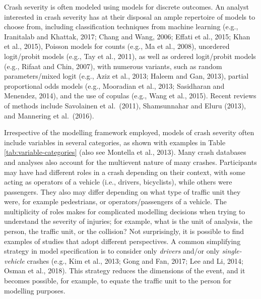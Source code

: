 \documentclass[]{elsarticle} %
\begin{document}
Crash severity is often modeled using models for discrete outcomes. An
analyst interested in crash severity has at their disposal an ample
repertoire of models to choose from, including classification techniques
from machine learning (e.g., Iranitalab and Khattak, 2017; Chang and
Wang, 2006; Effati et al., 2015; Khan et al., 2015), Poisson models for
counts (e.g., Ma et al., 2008), unordered logit/probit models (e.g., Tay
et al., 2011), as well as ordered logit/probit models (e.g., Rifaat and
Chin, 2007), with numerous variants, such as random parameters/mixed
logit (e.g., Aziz et al., 2013; Haleem and Gan, 2013), partial
proportional odds models (e.g., Mooradian et al., 2013; Sasidharan and
Menendez, 2014), and the use of copulas (e.g., Wang et al., 2015).
Recent reviews of methods include Savolainen et al.~(2011), Shamsunnahar
and Eluru (2013), and Mannering et al.~(2016).

Irrespective of the modelling framework employed, models of crash
severity often include variables in several categories, as shown with
examples in Table \ref{tab:variable-categories} (also see Montella et
al., 2013). Many crash databases and analyses also account for the
multievent nature of many crashes. Participants may have had different
roles in a crash depending on their context, with some acting as
operators of a vehicle (i.e., drivers, bicyclists), while others were
passengers. They also may differ depending on what type of traffic unit
they were, for example pedestrians, or operators/passengers of a
vehicle. The multiplicity of roles makes for complicated modelling
decisions when trying to understand the severity of injuries; for
example, what is the unit of analysis, the person, the traffic unit, or
the collision? Not surprisingly, it is possible to find examples of
studies that adopt different perspectives. A common simplifying strategy
in model specification is to consider only \emph{drivers} and/or only
\emph{single-vehicle} crashes (e.g., Kim et al., 2013; Gong and Fan,
2017; Lee and Li, 2014; Osman et al., 2018). This strategy reduces the
dimensions of the event, and it becomes possible, for example, to equate
the traffic unit to the person for modelling purposes.
\end{document}
